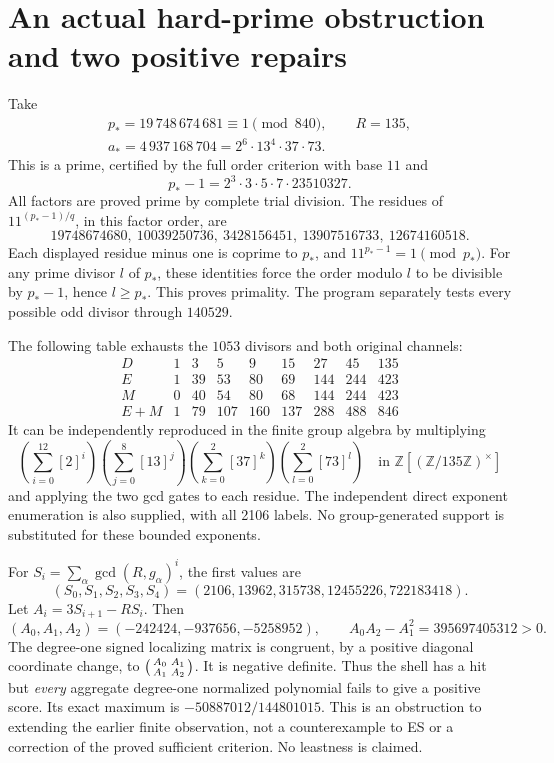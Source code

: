 \section{An actual hard-prime obstruction and two positive repairs}\label{sec:hard}
Take
\[
 \boxed{\begin{gathered}p_*=19\,748\,674\,681\equiv1\pmod{840},\qquad R=135,\\
 a_*=4\,937\,168\,704=2^6\cdot13^4\cdot37\cdot73.\end{gathered}}
 \tag{21}
\]
This is a prime, certified by the full order criterion with base $11$ and
\[
 p_*-1=2^3\cdot3\cdot5\cdot7\cdot23510327.
\]
All factors are proved prime by complete trial division. The residues of
$11^{(p_*-1)/q}$, in this factor order, are
\[
 19748674680,\ 10039250736,\ 3428156451,\ 13907516733,\ 12674160518.
\]
Each displayed residue minus one is coprime to $p_*$, and
$11^{p_*-1}=1\pmod{p_*}$.
For any prime divisor $l$ of $p_*$, these identities force the order modulo
$l$ to be divisible by $p_*-1$, hence $l\ge p_*$. This proves primality.
The program separately tests every possible odd divisor through $140529$.

The following table exhausts the $1053$ divisors and both original channels:
\[
\begin{array}{c|rrrrrrrr}
D&1&3&5&9&15&27&45&135\\\hline
E&1&39&53&80&69&144&244&423\\
M&0&40&54&80&68&144&244&423\\
E+M&1&79&107&160&137&288&488&846
\end{array}\tag{22}
\]
It can be independently reproduced in the finite group algebra by multiplying
\[
 (\sum_{i=0}^{12}[2]^i)(\sum_{j=0}^8[13]^j)
 (\sum_{k=0}^2[37]^k)(\sum_{l=0}^2[73]^l)
 \quad\text{in }\mathbb Z[(\mathbb Z/135\mathbb Z)^\times]
 \tag{23}
\]
and applying the two gcd gates to each residue. The independent direct
exponent enumeration is also supplied, with all 2106 labels. No group-generated
support is substituted for these bounded exponents.

For $S_i=\sum_\alpha\gcd(R,g_\alpha)^i$, the first values are
\[
(S_0,S_1,S_2,S_3,S_4)
=(2106,13962,315738,12455226,722183418).
\]
Let $A_i=3S_{i+1}-RS_i$. Then
\[
 (A_0,A_1,A_2)=(-242424,-937656,-5258952),\qquad
 A_0A_2-A_1^2=395697405312>0.
 \tag{24}
\]
The degree-one signed localizing matrix is congruent, by a positive diagonal
coordinate change, to $\begin{psmallmatrix}A_0&A_1\\A_1&A_2\end{psmallmatrix}$.
It is negative definite. Thus the shell has a hit but \emph{every} aggregate
degree-one normalized polynomial fails to give a positive score. Its exact
maximum is $-50887012/144801015$.
This is an obstruction to extending the earlier finite observation, not a
counterexample to ES or a correction of the proved sufficient criterion.
No leastness is claimed.

